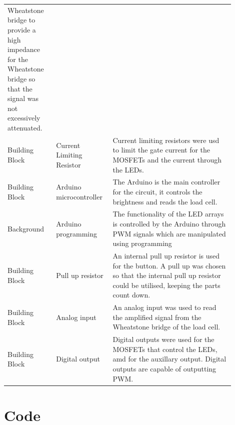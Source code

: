 \documentclass[twoside]{article}
\begin{document}
\begin{appendices}
\begin{center}
\begin{longtable}{ p{0.2\linewidth} p{0.2\linewidth} p{0.5\linewidth}}
                Wheatstone bridge to provide a high impedance for the Wheatstone bridge so that the signal was not excessively attenuated. \\
                Building Block & Current Limiting Resistor & Current limiting resistors were usd to limit the gate current for the MOSFETs and the current through the LEDs. \\
                Building Block & Arduino microcontroller & The Arduino is the main controller for the circuit, it controls the brightness and reads the load cell. \\
                Background & Arduino programming & The functionality of the LED arrays is controlled by the Arduino through PWM signals which are manipulated using programming \\
                Building Block & Pull up resistor & An internal pull up resistor is used for the button. A pull up was chosen so that the internal pull up resistor could be utilised, keeping the parts count down.\\
                Building Block & Analog input & An analog input was used to read the amplified signal from the Wheatstone bridge of the load cell. \\
                Building Block & Digital output & Digital outputs were used for the MOSFETs that control the LEDs, amd for the auxillary output. Digital outputs are capable of outputting PWM.
            \end{longtable}
        \end{center}
    \newpage

    \section{Code}
        \label{appendix:listing}
        
        
        
        
        
        
        
        
        
        
        
        
    \newpage

\end{appendices}
\end{document}
